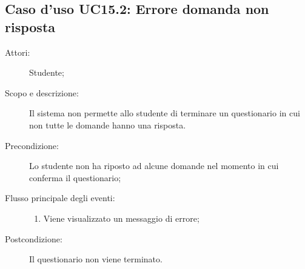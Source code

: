 \subsection{Caso d'uso UC15.2: Errore domanda non risposta}\begin{description}
\item[Attori:] Studente;
\item[Scopo e descrizione:] Il sistema non permette allo studente di terminare un questionario in cui non tutte le domande hanno una risposta.
      \item[Precondizione:] Lo studente non ha riposto ad alcune domande nel momento in cui conferma il questionario;

        \item[Flusso principale degli eventi:] \begin{enumerate}
          \item Viene visualizzato un messaggio di errore;

      \end{enumerate}
    \item[Postcondizione:] Il questionario non viene terminato.
  \end{description}
\hypertarget{UC15.3}{}
